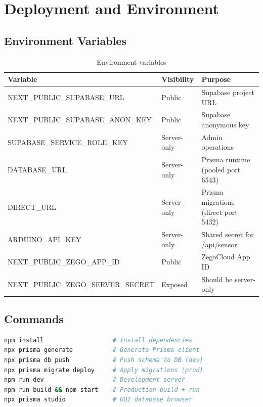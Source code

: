 \documentclass[12pt,a4paper]{report}
\begin{document}
\chapter{Deployment and Environment}

\section{Environment Variables}

\begin{table}[H]\centering\renewcommand{\arraystretch}{1.4}
\begin{tabularx}{\linewidth}{>{\ttfamily\small}l l X}
\toprule
Variable & Visibility & Purpose \\
\midrule
NEXT\_PUBLIC\_SUPABASE\_URL & Public & Supabase project URL \\
NEXT\_PUBLIC\_SUPABASE\_ANON\_KEY & Public & Supabase anonymous key \\
SUPABASE\_SERVICE\_ROLE\_KEY & Server-only & Admin operations \\
DATABASE\_URL & Server-only & Prisma runtime (pooled port 6543) \\
DIRECT\_URL & Server-only & Prisma migrations (direct port 5432) \\
ARDUINO\_API\_KEY & Server-only & Shared secret for /api/sensor \\
NEXT\_PUBLIC\_ZEGO\_APP\_ID & Public & ZegoCloud App ID \\
NEXT\_PUBLIC\_ZEGO\_SERVER\_SECRET & \textcolor{danger}{Exposed} & Should be server-only \\
\bottomrule
\end{tabularx}
\caption{Environment variables}
\end{table}

\section{Commands}

\begin{lstlisting}[language=bash,caption={Development and production commands}]
npm install                   # Install dependencies
npx prisma generate           # Generate Prisma client
npx prisma db push            # Push schema to DB (dev)
npx prisma migrate deploy     # Apply migrations (prod)
npm run dev                   # Development server
npm run build && npm start    # Production build + run
npx prisma studio             # GUI database browser
\end{lstlisting}
\end{document}
